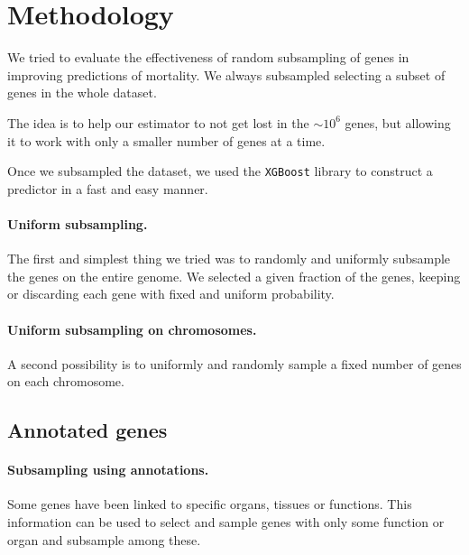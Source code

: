 \section{Methodology}
\label{sec:methods}

We tried to evaluate the effectiveness of random subsampling of genes in improving predictions of mortality.
We always subsampled selecting a subset of genes in the whole dataset.

The idea is to help our estimator to not get lost in the $\sim 10^6$ genes, but allowing it to work with only a smaller number of genes at a time.

Once we subsampled the dataset,  we used the \texttt{XGBoost}\cite{xgboost} library to construct a predictor in a fast and easy manner. 

\paragraph{Uniform subsampling.}
The first and simplest thing we tried was to randomly and uniformly subsample the genes on the entire genome.
We selected a given fraction of the genes, keeping or discarding each gene with fixed and uniform probability.

\paragraph{Uniform subsampling on chromosomes.}
A second possibility is to uniformly and randomly sample a fixed number of genes on each chromosome.

\subsection{Annotated genes}


\paragraph{Subsampling using annotations.}
Some genes have been linked to specific organs, tissues or functions. This information can be used to select and sample genes with only some function or organ and subsample among these.
